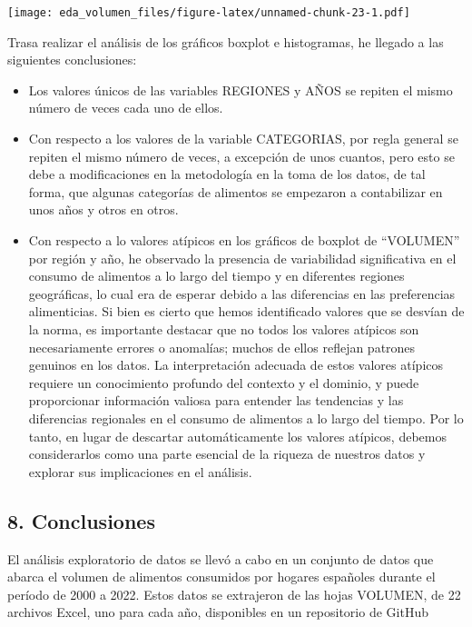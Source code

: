 \documentclass[
]{article}
\begin{document}
\texttt{[image: eda\_volumen\_files/figure-latex/unnamed-chunk-23-1.pdf]}

Trasa realizar el análisis de los gráficos boxplot e histogramas, he
llegado a las siguientes conclusiones:

\begin{itemize}
\item
  Los valores únicos de las variables REGIONES y AÑOS se repiten el
  mismo número de veces cada uno de ellos.
\item
  Con respecto a los valores de la variable CATEGORIAS, por regla
  general se repiten el mismo número de veces, a excepción de unos
  cuantos, pero esto se debe a modificaciones en la metodología en la
  toma de los datos, de tal forma, que algunas categorías de alimentos
  se empezaron a contabilizar en unos años y otros en otros.
\item
  Con respecto a lo valores atípicos en los gráficos de boxplot de
  ``VOLUMEN'' por región y año, he observado la presencia de
  variabilidad significativa en el consumo de alimentos a lo largo del
  tiempo y en diferentes regiones geográficas, lo cual era de esperar
  debido a las diferencias en las preferencias alimenticias. Si bien es
  cierto que hemos identificado valores que se desvían de la norma, es
  importante destacar que no todos los valores atípicos son
  necesariamente errores o anomalías; muchos de ellos reflejan patrones
  genuinos en los datos. La interpretación adecuada de estos valores
  atípicos requiere un conocimiento profundo del contexto y el dominio,
  y puede proporcionar información valiosa para entender las tendencias
  y las diferencias regionales en el consumo de alimentos a lo largo del
  tiempo. Por lo tanto, en lugar de descartar automáticamente los
  valores atípicos, debemos considerarlos como una parte esencial de la
  riqueza de nuestros datos y explorar sus implicaciones en el análisis.
\end{itemize}

\hypertarget{conclusiones}{%
\subsection{8. Conclusiones}\label{conclusiones}}

El análisis exploratorio de datos se llevó a cabo en un conjunto de
datos que abarca el volumen de alimentos consumidos por hogares
españoles durante el período de 2000 a 2022. Estos datos se extrajeron
de las hojas VOLUMEN, de 22 archivos Excel, uno para cada año,
disponibles en un repositorio de GitHub
\end{document}
